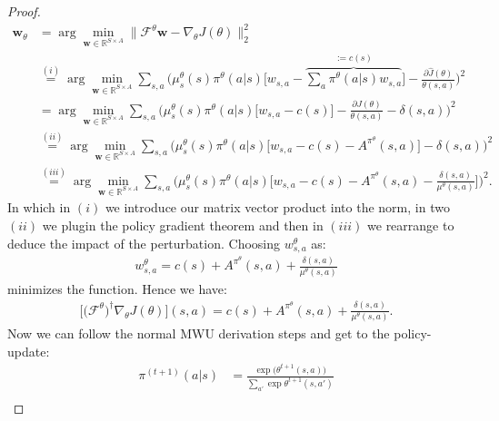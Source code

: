 \begin{proof}
\begin{align*}
            \bm{w}_\theta &
            = \arg\min_{\bm{w}\in \mathbb{R}^{S\times A}} 
            \Big\|
            \mathcal{F}^\theta \textbf{w} - \nabla_\theta J (\theta)
            \Big\|_2^2 \\
            & \stackrel{(i)}{=} \arg\min_{\bm{w}\in \mathbb{R}^{S\times A}}
            \sum_{s,a} 
            \Biggl(  
                \mu_s^\theta(s) \pi^\theta(a|s) 
                \Big[ w_{s,a} - \overbrace{\sum_a \pi^\theta(a|s) w_{s,a}}^{:=c(s)} \Big] - 
                \frac{\partial \hat{J}(\theta)}{\theta(s,a)}
            \Biggr)^2 \\
            & = \arg\min_{\bm{w}\in \mathbb{R}^{S\times A}}
            \sum_{s,a} 
            \Biggl(  
                \mu_s^\theta(s) \pi^\theta(a|s) \Big[ w_{s,a} - c(s) \Big] - 
                \frac{\partial {J}(\theta)}{\theta(s,a)} - \delta(s,a)
            \Biggr)^2\\
            & \stackrel{(ii)}{=}  \arg\min_{\bm{w}\in \mathbb{R}^{S\times A}}
            \sum_{s,a} 
            \Biggl(  
                \mu_s^\theta(s) \pi^\theta(a|s) \Big[ w_{s,a} - c(s) - A^{\pi^\theta}(s,a) \Big] - \delta(s,a)
            \Biggr)^2 \\
            & \stackrel{(iii)}{=}  \arg\min_{\bm{w}\in \mathbb{R}^{S\times A}}
            \sum_{s,a} 
            \Biggl(  
                \mu_s^\theta(s) \pi^\theta(a|s) \Big[ w_{s,a} - c(s) - A^{\pi^\theta}(s,a) - \frac{\delta(s,a)}{\mu^\theta(s,a)}  \Big] 
            \Biggr)^2.
        \end{align*}
        In which in $(i)$ we introduce our matrix vector product into the norm, in two $(ii)$ we plugin the policy gradient theorem and then in $(iii)$ we rearrange to deduce the impact of the perturbation. Choosing $w^\theta_{s,a}$ as:
        \begin{align}
            w^\theta_{s,a} = c(s) + A^{\pi^\theta}(s,a) + \frac{\delta(s,a)}{\mu^\theta(s,a)}
        \end{align}
        minimizes the function. Hence we have:
        \begin{align}
            \Big[ \bigl(\mathcal{F}^\theta\bigr)^\dagger \nabla_\theta J(\theta) \Big](s,a)
            = c(s) + A^{\pi^\theta}(s,a) + \frac{\delta(s,a)}{\mu^\theta(s,a)}.
        \end{align}
        Now we can follow the normal MWU derivation steps and get to the policy-update:
        \begin{align*}
            \pi^{(t+1)}(a|s) 
            &= \frac{\exp \big( \theta^{t+1}(s,a) \big) }{\sum_{a'} \exp \theta^{t+1}(s,a')} \\

\end{align*}
\end{proof}
